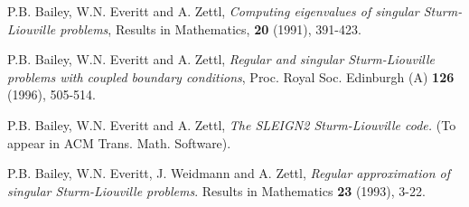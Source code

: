 \documentclass[12pt]{amsart}%
\theoremstyle{plain}
\numberwithin{equation}{section}
\numberwithin{theorem}{section}
\begin{document}
\begin{thebibliography}{9}                                                                                                %

P.B. Bailey, W.N. Everitt and A. Zettl, \emph{Computing
eigenvalues of singular Sturm-Liouville problems}, Results in Mathematics,
\textbf{20 }(1991), 391-423.

P.B. Bailey, W.N. Everitt and A. Zettl, \emph{Regular and
singular Sturm-Liouville problems with coupled boundary conditions}, Proc.
Royal Soc. Edinburgh (A) \textbf{126} (1996), 505-514.

P.B. Bailey, W.N. Everitt and A. Zettl, \emph{The SLEIGN2
Sturm-Liouville code.} (To appear in ACM Trans. Math. Software).

P.B. Bailey, W.N. Everitt, J. Weidmann and A. Zettl,
\emph{Regular approximation of singular Sturm-Liouville problems}. Results in
Mathematics \textbf{23} (1993), 3-22.
\end{thebibliography}
\end{document}
